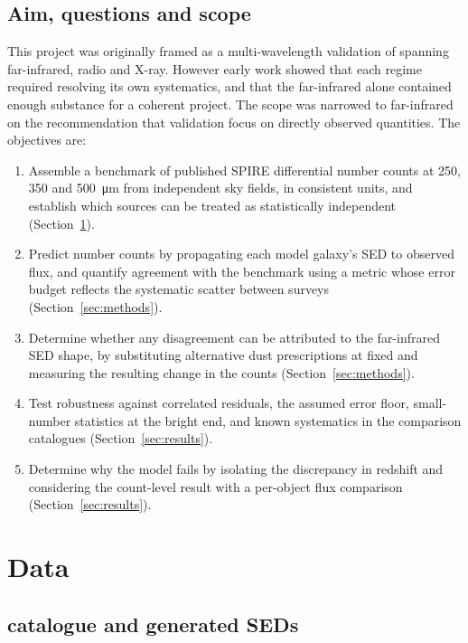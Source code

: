 \documentclass[12pt,a4paper]{article}
\begin{document}
\subsection{Aim, questions and scope}
\label{sec:intro:aims}

This project was originally framed as a multi-wavelength validation of \popcosmos{}
spanning far-infrared, radio and X-ray. However early work showed that each regime
required resolving its own systematics, and that the far-infrared alone contained
enough substance for a coherent project. The scope was narrowed to far-infrared on the
recommendation that validation focus on directly observed quantities. The objectives
are:

\begin{enumerate}
  \item Assemble a benchmark of published SPIRE differential number counts at 250, 350
        and \SI{500}{\um} from independent sky fields, in consistent units, and
        establish which sources can be treated as statistically independent
        (Section~\ref{sec:data}).
  \item Predict \popcosmos{} number counts by propagating each model galaxy's SED to
        observed flux, and quantify agreement with the benchmark using a metric whose
        error budget reflects the systematic scatter between surveys
        (Section~\ref{sec:methods}).
  \item Determine whether any disagreement can be attributed to the far-infrared SED
        shape, by substituting alternative dust prescriptions at fixed \LIR{} and
        measuring the resulting change in the counts (Section~\ref{sec:methods}).
  \item Test robustness against correlated residuals, the assumed error floor,
        small-number statistics at the bright end, and known systematics in the
        comparison catalogues (Section~\ref{sec:results}).
  \item Determine why the model fails by isolating the discrepancy in redshift
        and considering the count-level result with a per-object flux comparison
        (Section~\ref{sec:results}).
\end{enumerate}

\section{Data}
\label{sec:data}

\subsection{\popcosmos{} catalogue and generated SEDs}
\label{sec:data:popcosmos}
\end{document}
